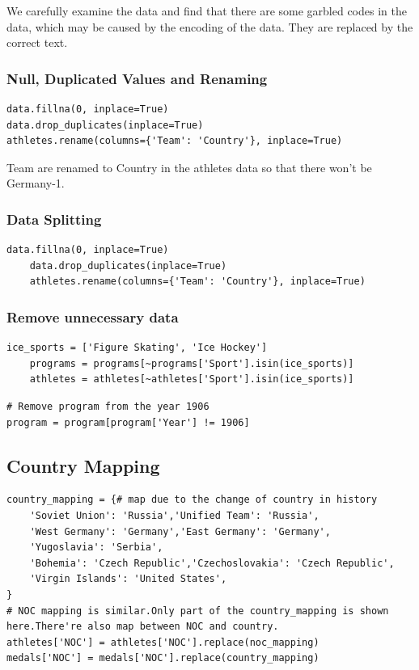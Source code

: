 We carefully examine the data and find that there are some garbled codes in the data, which may be caused by the encoding of the data. They are replaced by the correct text.

\subsubsection{Null, Duplicated Values and Renaming}


\begin{lstlisting}[caption=Data Cleaning]
data.fillna(0, inplace=True)
data.drop_duplicates(inplace=True)
athletes.rename(columns={'Team': 'Country'}, inplace=True)
\end{lstlisting}

Team are renamed to Country in the athletes data so that there won't be Germany-1.

\subsubsection{Data Splitting}

\begin{lstlisting}[caption=Data Splitting]
    data.fillna(0, inplace=True)
    data.drop_duplicates(inplace=True)
    athletes.rename(columns={'Team': 'Country'}, inplace=True)
    \end{lstlisting}

\subsubsection{Remove unnecessary data}
\begin{lstlisting}[caption=Remove Ice Sports]
    ice_sports = ['Figure Skating', 'Ice Hockey']
    programs = programs[~programs['Sport'].isin(ice_sports)]
    athletes = athletes[~athletes['Sport'].isin(ice_sports)]
\end{lstlisting}

\begin{lstlisting}[caption=Remove Program from 1906]
# Remove program from the year 1906
program = program[program['Year'] != 1906]    
\end{lstlisting}

\subsection{Country Mapping}

\begin{lstlisting}[caption=Country Mapping]
country_mapping = {# map due to the change of country in history
    'Soviet Union': 'Russia','Unified Team': 'Russia',
    'West Germany': 'Germany','East Germany': 'Germany',
    'Yugoslavia': 'Serbia',
    'Bohemia': 'Czech Republic','Czechoslovakia': 'Czech Republic',
    'Virgin Islands': 'United States',
}
# NOC mapping is similar.Only part of the country_mapping is shown here.There're also map between NOC and country.
athletes['NOC'] = athletes['NOC'].replace(noc_mapping)
medals['NOC'] = medals['NOC'].replace(country_mapping)
\end{lstlisting}

